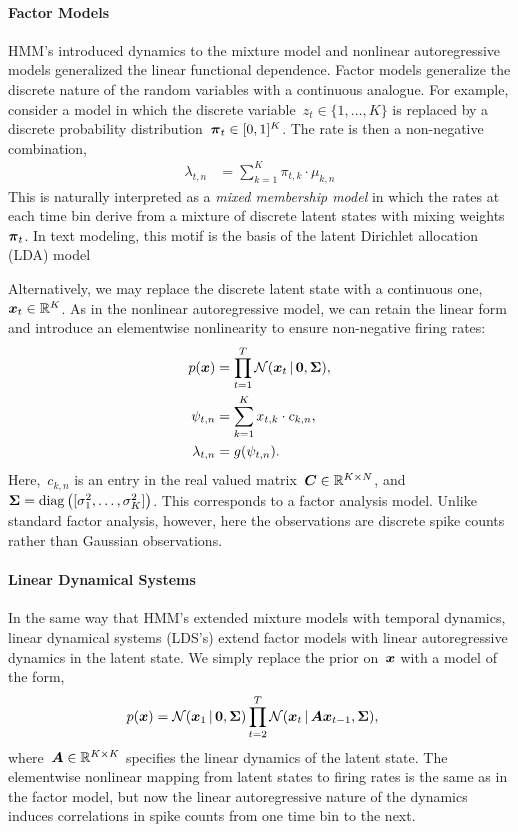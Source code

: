 \paragraph{Factor Models}
HMM's introduced dynamics to the mixture model and nonlinear
autoregressive models generalized the linear functional dependence.
Factor models generalize the discrete nature of the random variables
with a continuous analogue. For example, consider a model in which the
discrete variable~${z_t \in \{1, \ldots, K\}}$ is replaced by a
discrete probability distribution~${\boldsymbol{\pi}_t \in [0,1]^K}$. The rate
is then a non-negative combination,
\begin{align*}
  \lambda_{t,n} &= \sum_{k=1}^K \pi_{t,k} \cdot \mu_{k,n}
\end{align*}
This is naturally interpreted as a \emph{mixed membership model} in
which the rates at each time bin derive from a mixture of discrete
latent states with mixing weights~$\boldsymbol{\pi}_t$. In text modeling, this motif
is the basis of the latent Dirichlet allocation (LDA)
model~\cite{blei2003latent}

Alternatively, we may replace the discrete latent state with a continuous
one,~$\boldsymbol{x}_t \in \mathbb{R}^K$. As in the nonlinear autoregressive model,
we can retain the linear form and introduce an elementwise nonlinearity
to ensure non-negative firing rates:
\begin{align*}
  p(\boldsymbol{x}) &= \prod_{t=1}^T \mathcal{N}(\boldsymbol{x}_t \,|\, \boldsymbol{0}, \boldsymbol{\Sigma}), \\
  \psi_{t,n} &= \sum_{k=1}^K x_{t,k} \cdot c_{k,n}, \\
  \lambda_{t,n} &= g(\psi_{t,n}).
\end{align*}
Here,~$c_{k,n}$ is an entry in the real valued matrix~$\boldsymbol{C} \in
\mathbb{R}^{K \times N}$, and~${\boldsymbol{\Sigma} = \mathrm{diag} \left([ \sigma^2_1,
    \ldots, \sigma^2_K ] \right)}$.  This corresponds to a factor
analysis model. Unlike standard factor analysis, however, here the
observations are discrete spike counts rather than Gaussian
observations.

\paragraph{Linear Dynamical Systems}
In the same way that HMM's extended mixture models with temporal
dynamics, linear dynamical systems (LDS's) extend factor models with
linear autoregressive dynamics in the latent state.  We simply replace
the prior on~$\boldsymbol{x}$ with a model of the form,
\begin{align*}
  p(\boldsymbol{x}) &= \mathcal{N}(\boldsymbol{x}_1 \,|\, \boldsymbol{0}, \boldsymbol{\Sigma}) \prod_{t=2}^T \mathcal{N}(\boldsymbol{x}_t \,|\, \boldsymbol{A} \boldsymbol{x}_{t-1}, \boldsymbol{\Sigma}),
\end{align*}
where~$\boldsymbol{A} \in \mathbb{R}^{K \times K}$ specifies the linear dynamics of
the latent state.  The elementwise nonlinear mapping from latent
states to firing rates is the same as in the factor model, but now the
linear autoregressive nature of the dynamics induces correlations in
spike counts from one time bin to the next.

